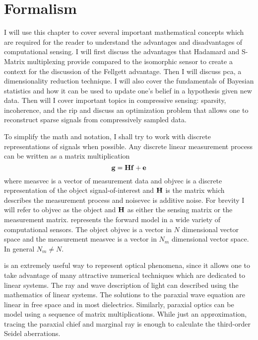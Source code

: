 \chapter{Formalism}\label{chap:Formalism}

I will use this chapter to cover several important mathematical concepts which are required for the reader to understand the advantages and disadvantages of computational sensing. I will first discuss the advantages that Hadamard and S-Matrix multiplexing provide compared to the isomorphic sensor to create a context for the discussion of the Fellgett advantage. Then I will discuss \acrfull{pca}, a dimensionality reduction technique. I will also cover the fundamentals of Bayesian statistics and how it can be used to update one's belief in a hypothesis given new data. Then will I cover important topics in compressive sensing: sparsity, incoherence, and the \acrfull{rip} and discuss an optimization problem that allows one to reconstruct sparse signals from compressively sampled data. 

To simplify the math and notation, I shall try to work with discrete representations of signals when possible. Any discrete linear measurement process can be written as a matrix multiplication
%
\begin{equation}
	\displaystyle \mathbf{g} = \displaystyle \mathbf{H} \displaystyle \mathbf{f} + \displaystyle \mathbf{e}	
\label{eq:gHf}
\end{equation}
%
where \gls{measvec} is a vector of measurement data and \gls{objvec} is a discrete representation of the object signal-of-interest and $\displaystyle \mathbf{H}$ is the matrix which describes the measurement process and \gls{noisevec} is additive noise. For brevity I will refer to \gls{objvec} as the object and $\displaystyle \mathbf{H}$ as either the sensing matrix or the measurement matrix.  represents the forward model in a wide variety of computational sensors. The object \gls{objvec} is a vector in $N$ dimensional vector space and the measurement \gls{measvec} is a vector in $N_m$ dimensional vector space. In general $N_m \neq N$. 

 is an extremely useful way to represent optical phenomena, since it allows one to take advantage of many attractive numerical techniques which are dedicated to linear systems. The ray and wave description of light can described using the mathematics of linear systems. The solutions to the paraxial wave equation are linear in free space and in most dielectrics. Similarly, paraxial optics can be model using a sequence of matrix multiplications. While just an approximation, tracing the paraxial chief and marginal ray is enough to calculate the third-order Seidel aberrations. 



